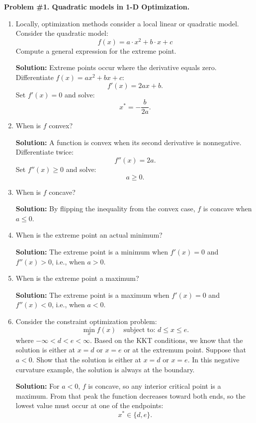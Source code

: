 \documentclass[11pt]{article}
\begin{document}
	
\textbf{Problem \#1. Quadratic models in 1-D Optimization.}
		
\begin{enumerate}[label=1(\alph*)]
	\item Locally, optimization methods consider a local linear or quadratic model. Consider the quadratic model:
	\[
	f(x) = a \cdot x^{2} + b \cdot x + c
	\]
	Compute a general expression for the extreme point.
	
	\textbf{Solution:} 
	Extreme points occur where the derivative equals zero. Differentiate $f(x) = a x^{2} + b x + c$:
	\[
	f'(x) = 2 a x + b.
	\]
	Set $f'(x) = 0$ and solve:
	\[
	x^* = -\frac{b}{2 a}.
	\]
	
	\item When is $f$ convex?

	\textbf{Solution:} 
	A function is convex when its second derivative is nonnegative. Differentiate twice:
	\[
	f''(x) = 2 a.
	\]
	Set $f''(x) \ge 0$ and solve:
	\[
	a \ge 0.
	\]
	
	\item When is $f$ concave?
	
	\textbf{Solution:} 
	By flipping the inequality from the convex case, $f$ is concave when $a \le 0$.
	
	\item When is the extreme point an actual minimum?
	
	\textbf{Solution:}  
	The extreme point is a minimum when $f'(x) = 0$ and $f''(x) > 0$, i.e., when $a > 0$.
	
	\item When is the extreme point a maximum?
	
	\textbf{Solution:}  
	The extreme point is a maximum when $f'(x) = 0$ and $f''(x) < 0$, i.e., when $a < 0$.
	
	\item Consider the constraint optimization problem:
	\[
	\min_{x} f(x) \quad \text{subject to: } d \le x \le e.
	\]
	where $-\infty < d < e < \infty$. Based on the KKT conditions, we know that the solution is either at $x = d$ or
	$x = e$ or at the extremum point. Suppose that $a < 0$. Show that the solution is either at $x = d$ or $x = e$. In
	this negative curvature example, the solution is always at the boundary.

	\textbf{Solution:}  
	For $a<0$, $f$ is concave, so any interior critical point is a maximum.  
	From that peak the function decreases toward both ends, so the lowest value must occur at one of the endpoints:
	\[
	x^* \in \{d, e\}.
	\]


\end{enumerate}
\end{document}
